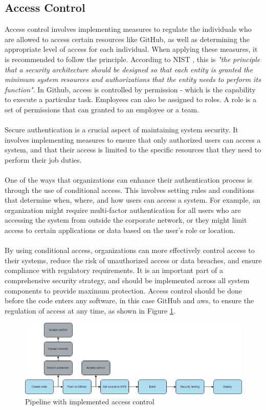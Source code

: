 \subsection{Access Control}
Access control involves implementing measures to regulate the individuals who are allowed to access certain resources like GitHub, as well as determining the appropriate level of access for each individual. When applying these measures, it is recommended to follow the  principle. According to NIST \cite{leastprivilege}, this is \textit{"the principle that a security architecture should be designed so that each entity is granted the minimum system resources and authorizations that the entity needs to perform its function"}. In Github, access is controlled by permission - which is the capability to execute a particular task. Employees can also be assigned to roles. A role is a set of permissions that can granted to an employee or a team. \cite{accesscontroll}
\\~\\
Secure authentication is a crucial aspect of maintaining system security. It involves implementing measures to ensure that only authorized users can access a system, and that their access is limited to the specific resources that they need to perform their job duties.
\\~\\
One of the ways that organizations can enhance their authentication process is through the use of conditional access. This involves setting rules and conditions that determine when, where, and how users can access a system. For example, an organization might require multi-factor authentication for all users who are accessing the system from outside the corporate network, or they might limit access to certain applications or data based on the user's role or location.
\\~\\
By using conditional access, organizations can more effectively control access to their systems, reduce the risk of unauthorized access or data breaches, and ensure compliance with regulatory requirements. It is an important part of a comprehensive security strategy, and should be implemented across all system components to provide maximum protection. Access control should be done before the code enters any software, in this case GitHub and \acrshort{aws}, to ensure the regulation of access at any time, as shown in Figure \ref{fig: Pipeline with implemented access control}.

\vspace{2mm}
\begin{figure}[H]
    \centering
    \includegraphics[width=0.8\columnwidth]{Images/pipeline7.png}
    \caption{Pipeline with implemented access control}
    \label{fig: Pipeline with implemented access control}
\end{figure}
 
